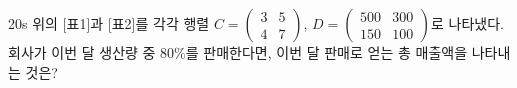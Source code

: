 \documentclass[10pt]{article}
\begin{document}
\begin{pagepair}
\begin{minipage}[t][210mm][t]{0.46\linewidth}
\begin{problem}{20}{s}
위의 [표1]과 [표2]를 각각 행렬 $C = \begin{pmatrix} 3 & 5 \\ 4 & 7 \end{pmatrix}$, $D = \begin{pmatrix} 500 & 300 \\ 150 & 100 \end{pmatrix}$로 나타냈다. 회사가 이번 달 생산량 중 $80\%$를 판매한다면, 이번 달 판매로 얻는 총 매출액을 나타내는 것은?
\begin{choices}
\end{choices}
\end{problem}
\end{minipage}
\end{pagepair}
\end{document}
